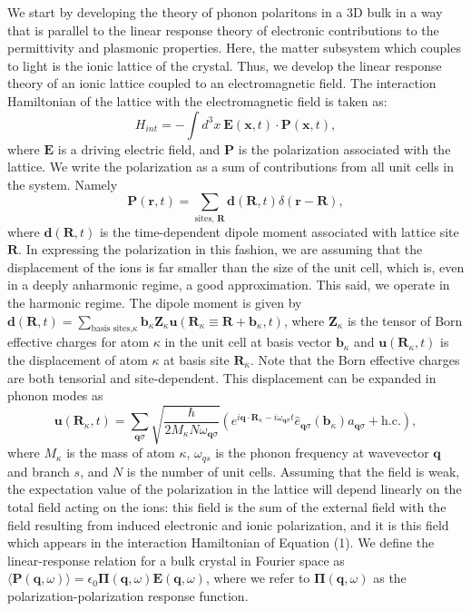 \documentclass[aps,prb,twocolumn,
	groupedaddress,superscriptaddress,
	amsfonts,amssymb,amsmath,floatfix,
	citeautoscript]{revtex4-1}
\begin{document}
We start by developing the theory of phonon polaritons in a 3D bulk in a way that is parallel to the linear response theory of electronic contributions to the permittivity and plasmonic properties. Here, the matter subsystem which couples to light is the ionic lattice of the crystal. Thus, we develop the linear response theory of an ionic lattice coupled to an electromagnetic field. The interaction Hamiltonian of the lattice with the electromagnetic field is taken as:
\begin{equation}
H_{int} = -\int d^3x ~\mathbf{E}(\mathbf{x},t)\cdot\mathbf{P}(\mathbf{x},t),
\end{equation}
where $\mathbf{E}$ is a driving electric field, and $\mathbf{P}$ is the polarization associated with the lattice. We write the polarization as a sum of contributions from all unit cells in the system. Namely
\begin{equation}
\mathbf{P}(\mathbf{r},t) = \sum\limits_{\text{sites, }\mathbf{R}}\mathbf{d}(\mathbf{R},t)\delta(\mathbf{r}-\mathbf{R}),
\end{equation}
where $\mathbf{d}(\mathbf{R},t)$ is the time-dependent dipole moment associated with lattice site $\mathbf{R}$. In expressing the polarization in this fashion, we are assuming that the displacement of the ions is far smaller than the size of the unit cell, which is, even in a deeply anharmonic regime, a good approximation. This said, we operate in the harmonic regime.  The dipole moment is given by $\mathbf{d}(\mathbf{R},t) = \sum\limits_{\text{basis sites,}\kappa} \mathbf{b}_{\kappa} \mathbf{Z}_{\kappa}\mathbf{u}(\mathbf{R}_{\kappa} \equiv \mathbf{R}+\mathbf{b}_{\kappa},t)$, where $\mathbf{Z}_{\kappa}$ is the tensor of Born effective charges for atom $\kappa$ in the unit cell at basis vector $\mathbf{b}_{\kappa}$ and $\mathbf{u}(\mathbf{R}_{\kappa},t)$ is the displacement of atom $\kappa$ at basis site $\mathbf{R}_{\kappa}$. Note that the Born effective charges are both tensorial and site-dependent.  This displacement can be expanded in phonon modes as
\begin{equation}
\mathbf{u}(\mathbf{R}_{\kappa},t) = \sum\limits_{\mathbf{q}\sigma}\sqrt{\frac{\hbar}{2M_{\kappa}N\omega_{\mathbf{q}\sigma}}}\left( e^{i\mathbf{q}\cdot\mathbf{R}_{\kappa}-i\omega_{\mathbf{q}\sigma}t}\hat{e}_{\mathbf{q}\sigma}(\mathbf{b}_{\kappa})a_{\mathbf{q}\sigma} + \text{h.c.} \right),
\end{equation}
where $M_{\kappa}$ is the mass of atom $\kappa$, $\omega_{qs}$ is the phonon frequency at wavevector $\mathbf{q}$ and branch $s$, and $N$ is the number of unit cells.
Assuming that the field is weak, the expectation value of the polarization in the lattice will depend linearly on the total field acting on the ions: this field is the sum of the external field with the field resulting from induced electronic and ionic polarization, and it is this field which appears in the interaction Hamiltonian of Equation (1). We define the linear-response relation for a bulk crystal in Fourier space as $\langle\mathbf{P}(\mathbf{q},\omega)\rangle = \epsilon_0\boldsymbol{\Pi}(\mathbf{q},\omega)\mathbf{E}(\mathbf{q},\omega)$, where we refer to $\boldsymbol{\Pi}(\mathbf{q},\omega)$ as the polarization-polarization response function.
\end{document}
